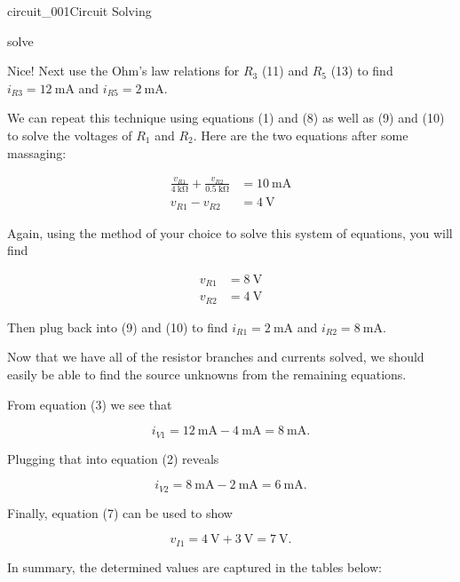 \begin{mainquestion}{circuit_001}{Circuit Solving}
\begin{partquestion}{solve}
\begin{answer}
Nice! Next use the Ohm's law relations for $R_3$ (11) and $R_5$ (13) to find
$i_{R3}=\qty{12}{\milli\ampere}$ and
$i_{R5}=\qty{2}{\milli\ampere}$.

We can repeat this technique using equations (1) and (8) as well as (9) and (10) to solve the voltages of $R_1$ and $R_2$. Here are the two equations after some massaging:

\begin{align*}
\frac{v_{R1}}{\qty{4}{\kilo\ohm}}
+
\frac{v_{R2}}{\qty{0.5}{\kilo\ohm}}
&=
\qty{10}{\milli\ampere} \\
v_{R1}-v_{R2}
&=
\qty{4}{\volt}
\end{align*}

Again, using the method of your choice to solve this system of equations, you will find

\begin{align*}
v_{R1} &= \qty{8}{\volt} \\
v_{R2} &= \qty{4}{\volt}
\end{align*}

Then plug back into (9) and (10) to find
$i_{R1}=\qty{2}{\milli\ampere}$ and
$i_{R2}=\qty{8}{\milli\ampere}$.

Now that we have all of the resistor branches and currents solved, we should easily be able to find the source unknowns from the remaining equations.

From equation (3) we see that

\[
i_{V1}
=
\qty{12}{\milli\ampere}
-
\qty{4}{\milli\ampere}
=
\qty{8}{\milli\ampere}.
\]

Plugging that into equation (2) reveals

\[
i_{V2}
=
\qty{8}{\milli\ampere}
-
\qty{2}{\milli\ampere}
=
\qty{6}{\milli\ampere}.
\]

Finally, equation (7) can be used to show

\[
v_{I1}
=
\qty{4}{\volt}
+
\qty{3}{\volt}
=
\qty{7}{\volt}.
\]

In summary, the determined values are captured in the tables below:

\begin{table}[htbp]
\centering


\end{table}
\end{answer}
\end{partquestion}
\end{mainquestion}
